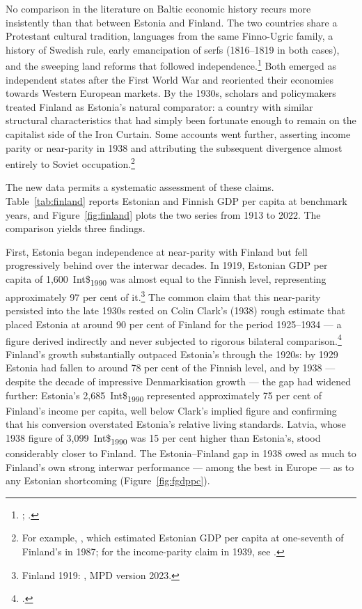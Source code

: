 \documentclass[12pt,a4paper]{article}
\newcommand{\intlnineteen}{Int\$\textsubscript{1990}}   %
\begin{document}
No comparison in the literature on Baltic economic history recurs more insistently than that between Estonia and Finland. The two countries share a Protestant cultural tradition, languages from the same Finno-Ugric family, a history of Swedish rule, early emancipation of serfs (1816--1819 in both cases), and the sweeping land reforms that followed independence.\footnote{\autocite[129]{corum2013}; \autocite{norkus_denmarkisation}.} Both emerged as independent states after the First World War and reoriented their economies towards Western European markets. By the 1930s, scholars and policymakers treated Finland as Estonia's natural comparator: a country with similar structural characteristics that had simply been fortunate enough to remain on the capitalist side of the Iron Curtain. Some accounts went further, asserting income parity or near-parity in 1938 and attributing the subsequent divergence almost entirely to Soviet occupation.\footnote{For example, \autocite[1]{laarmiracle}, which estimated Estonian GDP per capita at one-seventh of Finland's in 1987; for the income-parity claim in 1939, see \autocite[300]{estonia_history}.}

The new data permits a systematic assessment of these claims. Table~\ref{tab:finland} reports Estonian and Finnish GDP per capita at benchmark years, and Figure~\ref{fig:finland} plots the two series from 1913 to 2022. The comparison yields three findings.

First, Estonia began independence at near-parity with Finland but fell progressively behind over the interwar decades. In 1919, Estonian GDP per capita of 1,600~\intlnineteen{} was almost equal to the Finnish level, representing approximately 97 per cent of it.\footnote{Finland 1919: \autocite{mpd2023}, MPD version 2023.} The common claim that this near-parity persisted into the late 1930s rested on Colin Clark's (1938) rough estimate that placed Estonia at around 90 per cent of Finland for the period 1925--1934 — a figure derived indirectly and never subjected to rigorous bilateral comparison.\footnote{\autocite[60]{clark1938}.} Finland's growth substantially outpaced Estonia's through the 1920s: by 1929 Estonia had fallen to around 78 per cent of the Finnish level, and by 1938 — despite the decade of impressive Denmarkisation growth — the gap had widened further: Estonia's 2,685~\intlnineteen{} represented approximately 75 per cent of Finland's income per capita, well below Clark's implied figure and confirming that his conversion overstated Estonia's relative living standards. Latvia, whose 1938 figure of 3,099~\intlnineteen{} was 15 per cent higher than Estonia's, stood considerably closer to Finland. The Estonia--Finland gap in 1938 owed as much to Finland's own strong interwar performance — among the best in Europe — as to any Estonian shortcoming (Figure~\ref{fig:fgdppc}).
\end{document}
